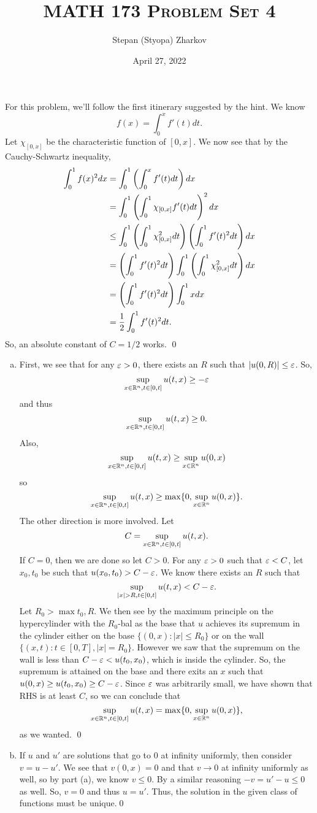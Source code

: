 \documentclass{article}
\title{\textsc{MATH 173 Problem Set 4}}
\author{Stepan (Styopa) Zharkov}
\date{April 27, 2022}
\begin{document}
\maketitle
{}  \tri
\hop
\solution
For this problem, we'll follow the first itinerary suggested by the hint. We know
\[f(x) = \int_0^x f'(t)dt.\]
Let $\chi_{[0,x]}$ be the characteristic function of $[0,x]$. We now see that by the Cauchy-Schwartz inequality,
\begin{align*}
    \int_0^1f(x)^2 dx &= \int_0^1\del{ \int_0^x f'(t)dt}dx \\
    &= \int_0^1\del{ \int_0^1 \chi_{[0,x]}f'(t)dt}^2dx \\
    & \le  \int_0^1\del{ \int_0^1 \chi_{[0,x]}^2dt}\del{ \int_0^1 f'(t)^2dt}dx \\
    &= \del{ \int_0^1 f'(t)^2dt} \int_0^1\del{ \int_0^1 \chi_{[0,x]}^2dt}dx \\
    &=  \del{ \int_0^1 f'(t)^2dt} \int_0^1 xdx \\
    &=\frac{1}{2}   \int_0^1 f'(t)^2dt.
\end{align*}
So, an absolute constant of $C = 1/2$ works. \qed

\newpage
{} \tri
\hop
\solution
\begin{enumerate}[(a)]
    \item First, we see that for any $\varepsilon > 0$, there exists an $R$ such that $|u(0,R)| \le \varepsilon$. So, 
    \[\sup_{x \in \mathbb{R}^n, t \in [0,t]}u(t,x) \ge -\varepsilon\]
    and thus 
    \[\sup_{x \in \mathbb{R}^n, t \in [0,t]}u(t,x) \ge 0.\]
    Also,
    \[\sup_{x \in \mathbb{R}^n, t \in [0,t]}u(t,x) \ge \sup_{x \in \mathbb{R}^n}u(0,x)\]
    so 
    \[\sup_{x \in \mathbb{R}^n, t \in [0,t]}u(t,x) \ge \max\{0, \sup_{x \in \mathbb{R}^n}u(0,x)\}.\]
    The other direction is more involved. Let
    \[C = \sup_{x \in \mathbb{R}^n, t \in [0,t]}u(t,x).\]
    If $C = 0$, then we are done so let $C>0$.
    For any $\varepsilon > 0$ such that $\varepsilon < C$, let $x_0, t_0$ be such that $u(x_0, t_0) > C - \varepsilon$. We know there exists an $R$ such that 
    \[\sup_{|x| > R, t \in [0,t]}u(t,x) < C - \varepsilon.\]
    Let $R_0 > \max{t_0, R}$. We then see by the maximum principle on the hypercylinder with the $R_0$-bal as the base that $u$ achieves its supremum in the cylinder either on the base $\{(0,x): |x| \le R_0\}$ or on the wall $\{(x,t) : t \in [0,T], |x| = R_0\}$. However we saw that the supremum on the wall is less than $C-\varepsilon < u(t_0, x_0)$, which is inside the cylinder. So, the supremum is attained on the base and there exits an $x$ such that $u(0,x) \ge u(t_0, x_0) \ge C- \varepsilon$. Since $\varepsilon$ was arbitrarily small, we have shown that RHS is at least $C$, so we can conclude that 
    \[\sup_{x \in \mathbb{R}^n, t \in [0,t]}u(t,x) = \max\{0, \sup_{x \in \mathbb{R}^n}u(0,x)\},\]
    as we wanted. \qed
    \item If $u$ and $u'$ are solutions that go to 0 at infinity uniformly, then consider $v = u - u'$. We see that $v(0,x) = 0$ and that $v \to 0$ at infinity uniformly as well, so by part (a), we know $v \le 0$. By a similar reasoning $-v = u' - u \le 0$ as well. So, $v = 0$ and thus $u = u'$. Thus, the solution in the given class of functions must be unique.\qed 
\end{enumerate}
\end{document}
